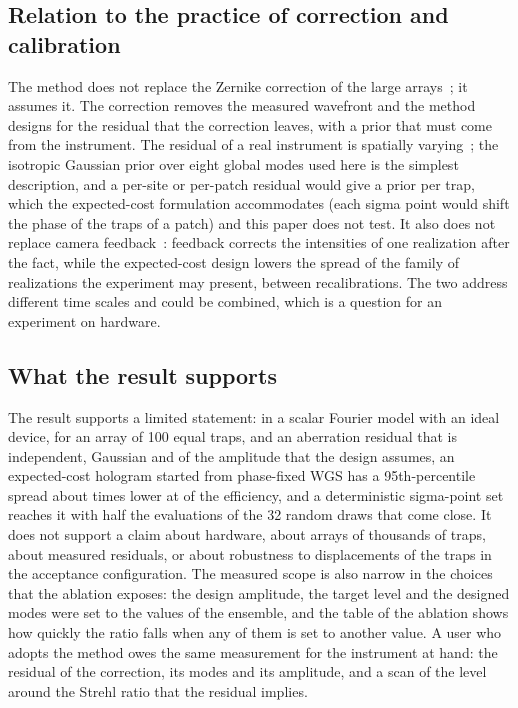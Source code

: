\subsection{Relation to the practice of correction and calibration}

The method does not replace the Zernike correction of the large arrays~\cite{nogrette2014,ebadi2021,manetsch2025}; it assumes it. The correction removes the measured wavefront and the method designs for the residual that the correction leaves, with a prior that must come from the instrument. The residual of a real instrument is spatially varying~\cite{machu2025,christen2025}; the isotropic Gaussian prior over eight global modes used here is the simplest description, and a per-site or per-patch residual would give a prior per trap, which the expected-cost formulation accommodates (each sigma point would shift the phase of the traps of a patch) and this paper does not test.
It also does not replace camera feedback~\cite{nogrette2014,kim2019}: feedback corrects the intensities of one realization after the fact, while the expected-cost design lowers the spread of the family of realizations the experiment may present, between recalibrations. The two address different time scales and could be combined, which is a question for an experiment on hardware.

\subsection{What the result supports}

The result supports a limited statement: in a scalar Fourier model with an ideal device, for an array of 100 equal traps, and an aberration residual that is independent, Gaussian and of the amplitude that the design assumes, an expected-cost hologram started from phase-fixed WGS has a 95th-percentile spread about \ratioMed{} times lower at \effRatioMed{} of the efficiency, and a deterministic sigma-point set reaches it with half the evaluations of the 32 random draws that come close. It does not support a claim about hardware, about arrays of thousands of traps, about measured residuals, or about robustness to displacements of the traps in the acceptance configuration. The measured scope is also narrow in the choices that the ablation exposes: the design amplitude, the target level and the designed modes were set to the values of the ensemble, and the table of the ablation shows how quickly the ratio falls when any of them is set to another value. A user who adopts the method owes the same measurement for the instrument at hand: the residual of the correction, its modes and its amplitude, and a scan of the level around the Strehl ratio that the residual implies.
